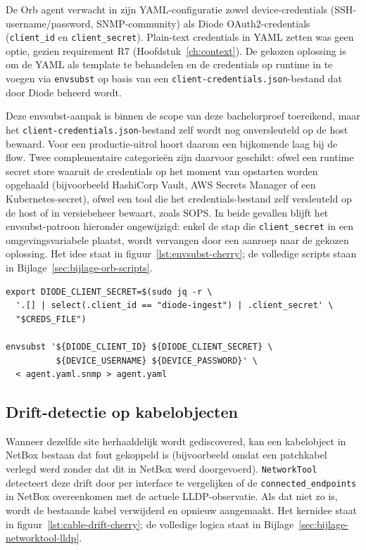 De Orb agent verwacht in zijn YAML-configuratie zowel device-credentials (SSH-username/password, SNMP-community) als Diode OAuth2-credentials (\texttt{client\_id} en \texttt{client\_secret}). Plain-text credentials in YAML zetten was geen optie, gezien requirement R7 (Hoofdstuk~\ref{ch:context}). De gekozen oplossing is om de YAML als template te behandelen en de credentials op runtime in te voegen via \texttt{envsubst} op basis van een \texttt{client-credentials.json}-bestand dat door Diode beheerd wordt.

Deze envsubst-aanpak is binnen de scope van deze bachelorproef toereikend, maar het \texttt{client-credentials.json}-bestand zelf wordt nog onversleuteld op de host bewaard. Voor een productie-uitrol hoort daarom een bijkomende laag bij de flow. Twee complementaire categorieën zijn daarvoor geschikt: ofwel een runtime secret store waaruit de credentials op het moment van opstarten worden opgehaald (bijvoorbeeld HashiCorp Vault, AWS Secrets Manager of een Kubernetes-secret), ofwel een tool die het credentials-bestand zelf versleuteld op de host of in versiebeheer bewaart, zoals SOPS\autocite{SOPS}. In beide gevallen blijft het envsubst-patroon hieronder ongewijzigd: enkel de stap die \texttt{client\_secret} in een omgevingsvariabele plaatst, wordt vervangen door een aanroep naar de gekozen oplossing. Het idee staat in figuur~\ref{lst:envsubst-cherry}; de volledige scripts staan in Bijlage~\ref{sec:bijlage-orb-scripts}.

\begin{listing}[H]
  \caption{Credentials op runtime injecteren (volledige scripts in bijlage)}
  \label{lst:envsubst-cherry}
  \begin{verbatim}
export DIODE_CLIENT_SECRET=$(sudo jq -r \
  '.[] | select(.client_id == "diode-ingest") | .client_secret' \
  "$CREDS_FILE")

envsubst '${DIODE_CLIENT_ID} ${DIODE_CLIENT_SECRET} \
          ${DEVICE_USERNAME} ${DEVICE_PASSWORD}' \
  < agent.yaml.snmp > agent.yaml
  \end{verbatim}
\end{listing}

\subsection{Drift-detectie op kabelobjecten}

Wanneer dezelfde site herhaaldelijk wordt gediscovered, kan een kabelobject in NetBox bestaan dat fout gekoppeld is (bijvoorbeeld omdat een patchkabel verlegd werd zonder dat dit in NetBox werd doorgevoerd). \texttt{NetworkTool} detecteert deze drift door per interface te vergelijken of de \texttt{connected\_endpoints} in NetBox overeenkomen met de actuele LLDP-observatie. Als dat niet zo is, wordt de bestaande kabel verwijderd en opnieuw aangemaakt. Het kernidee staat in figuur~\ref{lst:cable-drift-cherry}; de volledige logica staat in Bijlage~\ref{sec:bijlage-networktool-lldp}.

